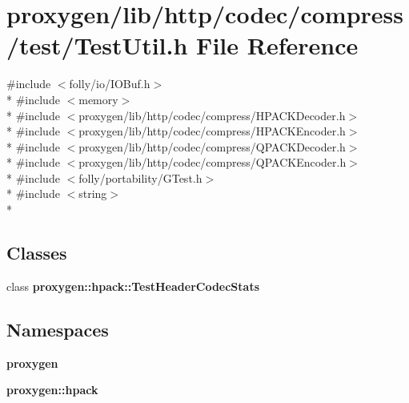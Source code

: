 \section{proxygen/lib/http/codec/compress/test/\+Test\+Util.h File Reference}
\label{TestUtil_8h}
{\ttfamily \#include $<$folly/io/\+I\+O\+Buf.\+h$>$}\\*
{\ttfamily \#include $<$memory$>$}\\*
{\ttfamily \#include $<$proxygen/lib/http/codec/compress/\+H\+P\+A\+C\+K\+Decoder.\+h$>$}\\*
{\ttfamily \#include $<$proxygen/lib/http/codec/compress/\+H\+P\+A\+C\+K\+Encoder.\+h$>$}\\*
{\ttfamily \#include $<$proxygen/lib/http/codec/compress/\+Q\+P\+A\+C\+K\+Decoder.\+h$>$}\\*
{\ttfamily \#include $<$proxygen/lib/http/codec/compress/\+Q\+P\+A\+C\+K\+Encoder.\+h$>$}\\*
{\ttfamily \#include $<$folly/portability/\+G\+Test.\+h$>$}\\*
{\ttfamily \#include $<$string$>$}\\*
\subsection*{Classes}
\begin{DoxyCompactItemize}
\item 
class {\bf proxygen\+::hpack\+::\+Test\+Header\+Codec\+Stats}
\end{DoxyCompactItemize}
\subsection*{Namespaces}
\begin{DoxyCompactItemize}
\item 
 {\bf proxygen}
\item 
 {\bf proxygen\+::hpack}
\end{DoxyCompactItemize}
